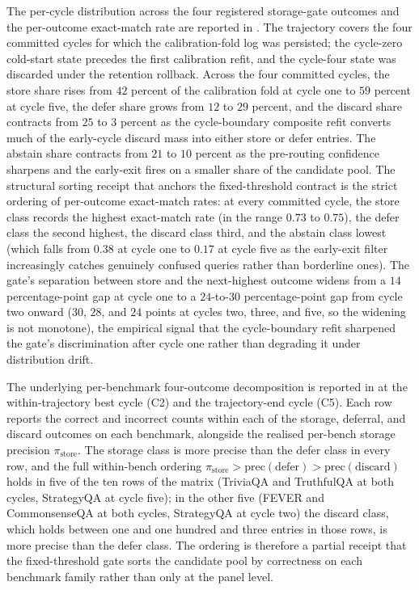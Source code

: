 The per-cycle distribution across the four registered storage-gate outcomes and the per-outcome exact-match rate are reported in . The trajectory covers the four committed cycles for which the calibration-fold log was persisted; the cycle-zero cold-start state precedes the first calibration refit, and the cycle-four state was discarded under the retention rollback. Across the four committed cycles, the store share rises from $42$ percent of the calibration fold at cycle one to $59$ percent at cycle five, the defer share grows from $12$ to $29$ percent, and the discard share contracts from $25$ to $3$ percent as the cycle-boundary composite refit converts much of the early-cycle discard mass into either store or defer entries. The abstain share contracts from $21$ to $10$ percent as the pre-routing confidence sharpens and the early-exit fires on a smaller share of the candidate pool. The structural sorting receipt that anchors the fixed-threshold contract is the strict ordering of per-outcome exact-match rates: at every committed cycle, the store class records the highest exact-match rate (in the range $0.73$ to $0.75$), the defer class the second highest, the discard class third, and the abstain class lowest (which falls from $0.38$ at cycle one to $0.17$ at cycle five as the early-exit filter increasingly catches genuinely confused queries rather than borderline ones). The gate's separation between store and the next-highest outcome widens from a $14$ percentage-point gap at cycle one to a $24$-to-$30$ percentage-point gap from cycle two onward ($30$, $28$, and $24$ points at cycles two, three, and five, so the widening is not monotone), the empirical signal that the cycle-boundary refit sharpened the gate's discrimination after cycle one rather than degrading it under distribution drift.



The underlying per-benchmark four-outcome decomposition is reported in  at the within-trajectory best cycle (C2) and the trajectory-end cycle (C5). Each row reports the correct and incorrect counts within each of the storage, deferral, and discard outcomes on each benchmark, alongside the realised per-bench storage precision $\pi_{\text{store}}$. The storage class is more precise than the defer class in every row, and the full within-bench ordering $\pi_{\text{store}} > \mathrm{prec}(\text{defer}) > \mathrm{prec}(\text{discard})$ holds in five of the ten rows of the matrix (TriviaQA and TruthfulQA at both cycles, StrategyQA at cycle five); in the other five (FEVER and CommonsenseQA at both cycles, StrategyQA at cycle two) the discard class, which holds between one and one hundred and three entries in those rows, is more precise than the defer class. The ordering is therefore a partial receipt that the fixed-threshold gate sorts the candidate pool by correctness on each benchmark family rather than only at the panel level.

